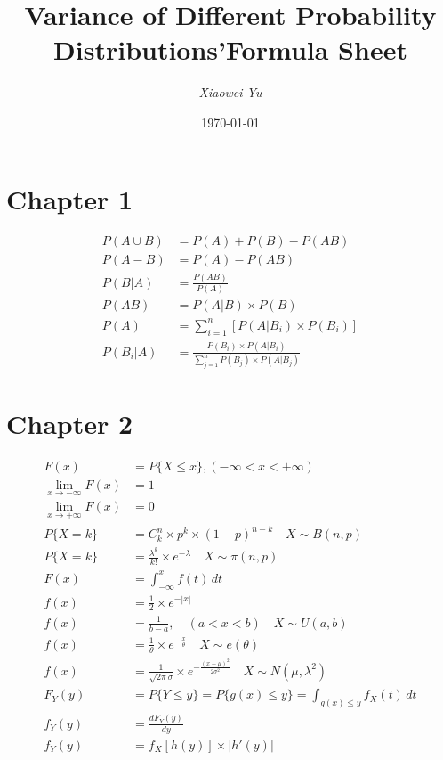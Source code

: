\documentclass[12pt]{article}
\newcommand{\Comb}[2]{C^{#1}_{#2}}
\begin{document}
\title{\textbf{Variance of Different Probability Distributions'Formula Sheet}}
\author{\textit{Xiaowei Yu}}
\date{\today}
\maketitle

\newpage
\tableofcontents
\newpage

\section{Chapter 1}

\begin{align}
    P(A\cup B)&=P(A)+P(B)-P(AB)\\
    P(A-B)&=P(A)-P(AB)\\
    P(B|A)&=\frac{P(AB)}{P(A)}\\
    P(AB)&=P(A|B)\times P(B)\\
    P(A)&=\sum_{i = 1}^{n}  [P(A|B_i)\times P(B_i)]\\
    P(B_i|A)&=\frac{P(B_i)\times P(A|B_i)}{\sum_{j = 1}^{n} P(B_j)\times P(A|B_j)}
\end{align}

\section{Chapter 2}

\begin{align}
    F(x)&=P\{X\leqslant x\}, (-\infty <x< +\infty)\\
    \lim_{x \to -\infty} F(x)&=1 \\
    \lim_{x \to +\infty} F(x)&=0 \\
    P\{X=k\}&=\Comb{n}{k} \times p^k \times (1-p)^{n-k} \quad X \sim B(n,p) \\
    P\{X=k\}&=\frac{\lambda^k}{k!} \times e^{-\lambda} \quad X\sim \pi(n,p)\\
    F(x)&=\int_{-\infty}^{x} f(t) \,dt \\
    f(x) &= \frac{1}{2} \times e^{-\left\lvert x \right\rvert }\\
    f(x) &= \frac{1}{b-a}, \quad (a<x<b) \quad X\sim U(a,b)\\
    f(x) &= \frac{1}{\theta} \times e^{-\frac{x}{\theta}} \quad X \sim e(\theta)\\
    f(x) &= \frac{1}{\sqrt{2\pi}\sigma} \times e^{-\frac{(x-\mu)^2}{2\sigma^2}} \quad X\sim N(\mu,\lambda^2)\\
    F_Y(y) &= P\{Y\leqslant y\}= P\{g(x)\leqslant y\} = \int_{g(x)\leqslant y} f_X(t) \, dt\\
    f_Y(y) &= \frac{dF_Y(y)}{dy} \\
    f_Y(y) &= f_X[h(y)] \times \left\lvert h'(y) \right\rvert 
\end{align}
\end{document}
